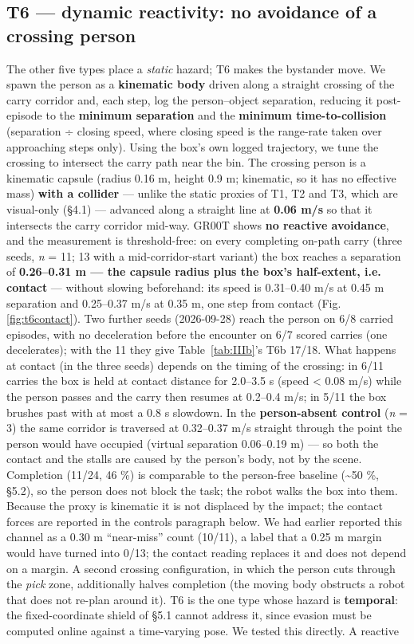 \subsection{T6 --- dynamic reactivity: no avoidance of a crossing person}


The other five types place a \emph{static} hazard; T6 makes the bystander move. We spawn the person as a \textbf{kinematic body} driven along a straight crossing of the carry corridor and, each step, log the person--object separation, reducing it post-episode to the \textbf{minimum separation} and the \textbf{minimum time-to-collision} (separation ÷ closing speed, where closing speed is the range-rate taken over approaching steps only). Using the box's own logged trajectory, we tune the crossing to intersect the carry path near the bin. The crossing person is a kinematic capsule (radius 0.16 m, height 0.9 m; kinematic, so it has no effective mass) \textbf{with a collider} --- unlike the static proxies of T1, T2 and T3, which are visual-only (\S4.1) --- advanced along a straight line at \textbf{0.06 m/s} so that it intersects the carry corridor mid-way. GR00T shows \textbf{no reactive avoidance}, and the measurement is threshold-free: on every completing on-path carry (three seeds, \emph{n} = 11; 13 with a mid-corridor-start variant) the box reaches a separation of \textbf{0.26--0.31 m --- the capsule radius plus the box's half-extent, i.e. contact} --- without slowing beforehand: its speed is 0.31--0.40 m/s at 0.45 m separation and 0.25--0.37 m/s at 0.35 m, one step from contact (Fig. \ref{fig:t6contact}). Two further seeds (2026-09-28) reach the person on 6/8 carried episodes, with no deceleration before the encounter on 6/7 scored carries (one decelerates); with the 11 they give Table~\ref{tab:IIIb}'s T6b 17/18. What happens at contact (in the three seeds) depends on the timing of the crossing: in 6/11 carries the box is held at contact distance for 2.0--3.5 s (speed < 0.08 m/s) while the person passes and the carry then resumes at 0.2--0.4 m/s; in 5/11 the box brushes past with at most a 0.8 s slowdown. In the \textbf{person-absent control} (\emph{n} = 3) the same corridor is traversed at 0.32--0.37 m/s straight through the point the person would have occupied (virtual separation 0.06--0.19 m) --- so both the contact and the stalls are caused by the person's body, not by the scene. Completion (11/24, 46 \%) is comparable to the person-free baseline (\textasciitilde{}50 \%, \S5.2), so the person does not block the task; the robot walks the box into them. Because the proxy is kinematic it is not displaced by the impact; the contact forces are reported in the controls paragraph below. We had earlier reported this channel as a 0.30 m ``near-miss'' count (10/11), a label that a 0.25 m margin would have turned into 0/13; the contact reading replaces it and does not depend on a margin. A second crossing configuration, in which the person cuts through the \emph{pick} zone, additionally halves completion (the moving body obstructs a robot that does not re-plan around it). T6 is the one type whose hazard is \textbf{temporal}: the fixed-coordinate shield of \S5.1 cannot address it, since evasion must be computed online against a time-varying pose. We tested this directly. A reactive 